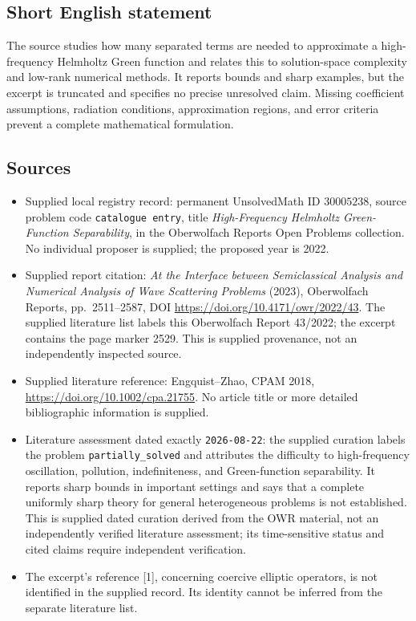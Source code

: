 \documentclass[11pt]{article}
\begin{document}
\subsection{Short English statement}
The source studies how many separated terms are needed to approximate a high-frequency Helmholtz Green function and relates this to solution-space complexity and low-rank numerical methods. It reports bounds and sharp examples, but the excerpt is truncated and specifies no precise unresolved claim. Missing coefficient assumptions, radiation conditions, approximation regions, and error criteria prevent a complete mathematical formulation.
\subsection{Sources}
\begin{itemize}
\item Supplied local registry record: permanent UnsolvedMath ID \(30005238\), source problem code \texttt{catalogue entry}, title \emph{High-Frequency Helmholtz Green-Function Separability}, in the Oberwolfach Reports Open Problems collection. No individual proposer is supplied; the proposed year is 2022.
\item Supplied report citation: \emph{At the Interface between Semiclassical Analysis and Numerical Analysis of Wave Scattering Problems} (2023), Oberwolfach Reports, pp.\ 2511--2587, DOI \url{https://doi.org/10.4171/owr/2022/43}. The supplied literature list labels this Oberwolfach Report 43/2022; the excerpt contains the page marker 2529. This is supplied provenance, not an independently inspected source.
\item Supplied literature reference: Engquist--Zhao, CPAM 2018, \url{https://doi.org/10.1002/cpa.21755}. No article title or more detailed bibliographic information is supplied.
\item Literature assessment dated exactly \texttt{2026-08-22}: the supplied curation labels the problem \texttt{partially\_solved} and attributes the difficulty to high-frequency oscillation, pollution, indefiniteness, and Green-function separability. It reports sharp bounds in important settings and says that a complete uniformly sharp theory for general heterogeneous problems is not established. This is supplied dated curation derived from the OWR material, not an independently verified literature assessment; its time-sensitive status and cited claims require independent verification.
\item The excerpt's reference [1], concerning coercive elliptic operators, is not identified in the supplied record. Its identity cannot be inferred from the separate literature list.
\end{itemize}
\end{document}
